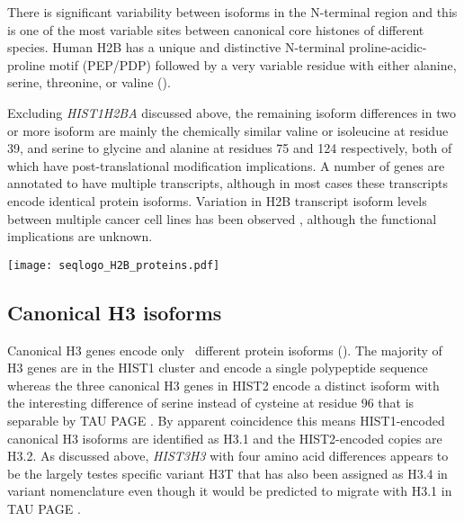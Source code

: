     There is significant variability between isoforms in the N-terminal region
    and this is one of the most variable sites between canonical
    core histones of different species.
    Human H2B has a unique and distinctive N-terminal proline-acidic-proline motif (PEP/PDP)
    followed by a very variable residue with either alanine, serine,
    threonine, or valine ().

    Excluding \textit{HIST1H2BA} discussed above,
    the remaining isoform differences in two or more isoform are mainly the chemically
    similar valine or isoleucine at residue 39,
    and serine to glycine and alanine at residues 75 and 124 respectively,
    both of which have post-translational modification implications.
    A number of genes are annotated to have multiple transcripts, 
    although in most cases these transcripts encode identical protein isoforms.
    Variation in H2B transcript isoform levels between multiple cancer cell
    lines has been observed \citep{Molden2015},
    although the functional implications are unknown.

    \begin{table}
      \caption{%
        Canonical H2B encoded protein isoforms.
        Upper panel shows isoform variations relative to most common isoform
        using HGVS recommended nomenclature \citep{mutnomenclature2016}.
        Lower panel shows sequence logo of all isoforms aligned 
        with invariant residues in grey.
      }
      \label{tab:H2B-consensus}
      
      \texttt{[image: seqlogo\_H2B\_proteins.pdf]}
    \end{table}

  \subsection{Canonical H3 isoforms}
    Canonical H3 genes encode only \HThreeUniqueProteins{}~different
    protein isoforms ().
    The majority of H3 genes are in the HIST1 cluster and encode a
    single polypeptide sequence \citep{Ederveen2011}
    whereas the three canonical H3 genes in HIST2 encode a distinct isoform
    with the interesting difference of serine instead of cysteine at residue 96
    that is separable by TAU PAGE \citep{FranklinZweidler1977}.
    By apparent coincidence this means HIST1-encoded canonical H3 isoforms are
    identified as H3.1 and the HIST2-encoded copies are H3.2.
    As discussed above, \textit{HIST3H3} with four amino acid differences 
    appears to be the largely testes specific variant H3T
    that has also been assigned as H3.4 in variant nomenclature \citep{Talbert2012}
    even though it would be predicted to migrate with H3.1 in TAU PAGE \citep{FranklinZweidler1977}.


